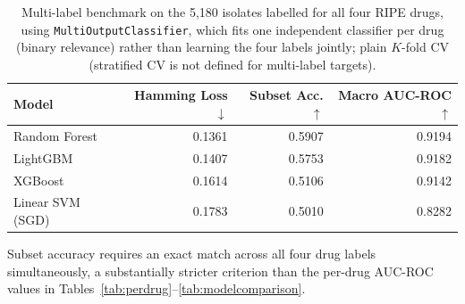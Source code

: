 \begin{table}[t]
\centering
\caption{Multi-label benchmark on the 5{,}180 isolates labelled for all four RIPE drugs, using \texttt{MultiOutputClassifier}, which fits one independent classifier per drug (binary relevance) rather than learning the four labels jointly; plain $K$-fold CV (stratified CV is not defined for multi-label targets).}
\label{tab:multilabel}
\small
\begin{tabular}{lrrr}
\toprule
Model & Hamming Loss $\downarrow$ & Subset Acc. $\uparrow$ & Macro AUC-ROC $\uparrow$ \\
\midrule
Random Forest    & 0.1361 & 0.5907 & 0.9194 \\
LightGBM         & 0.1407 & 0.5753 & 0.9182 \\
XGBoost          & 0.1614 & 0.5106 & 0.9142 \\
Linear SVM (SGD) & 0.1783 & 0.5010 & 0.8282 \\
\bottomrule
\end{tabular}

\vspace{4pt}
\footnotesize
Subset accuracy requires an exact match across all four drug labels simultaneously, a substantially stricter criterion than the per-drug AUC-ROC values in Tables~\ref{tab:perdrug}--\ref{tab:modelcomparison}.
\end{table}
